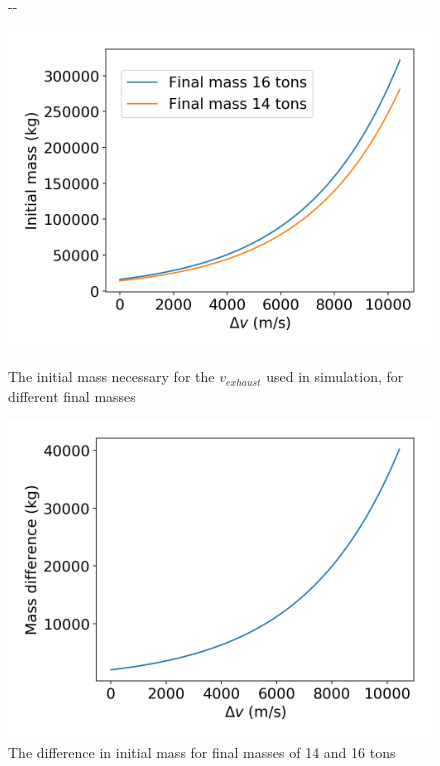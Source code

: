 \documentclass[11pt]{article}
\newlength{\offsetpage}
\newenvironment{widepage}{\begin{adjustwidth}{-\offsetpage}{-\offsetpage}%
    \addtolength{\textwidth}{2\offsetpage}}%
{\end{adjustwidth}}
\begin{document}
\begin{figure}[H]
  \begin{widepage}
    \centering
    \begin{minipage}{0.45\textwidth}
      \centering
      \includegraphics[width=\textwidth]{./plots/consumedToInitial.png}
      \caption{The initial mass necessary for the $v_{exhaust}$ used in simulation, for different final masses}
    \end{minipage}
    \hspace{0.025\textwidth}
    \begin{minipage}{0.45\textwidth}
      \centering
      \includegraphics[width=\textwidth]{./plots/consumedToInitial_diff.png}
      \caption{The difference in initial mass for final masses of 14 and 16 tons}
    \end{minipage}
  \end{widepage}
\end{figure}
\end{document}

